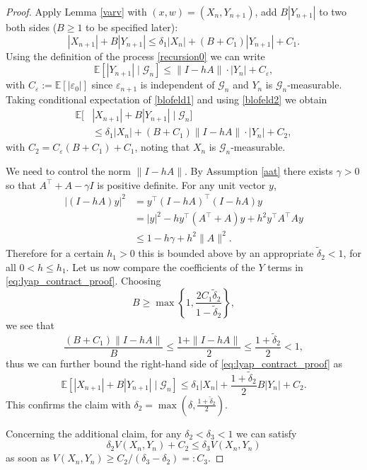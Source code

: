\documentclass{article}
\def\mE{\mathbb{E}}
\begin{document}
\begin{proof}
  Apply Lemma \ref{varv} with $(x,w)=(X_n,Y_{n+1})$, add $B|Y_{n+1}|$ to two both sides ($B\geq 1$ to be specified later):
\begin{equation}\label{blofeld1}
|X_{n+1}|+B|Y_{n+1}|\leq \delta_1 |X_{n}|+(B+C_1)|Y_{n+1}|+C_1.
\end{equation}
Using the definition of the process \eqref{recursion0} we can write
\begin{equation}\label{blofeld2}
\mE[|Y_{n+1}| \mid \mathcal{G}_{n}] \leq \|I-hA\|\cdot |Y_n| + C_{\varepsilon},
\end{equation}
with $C_{\varepsilon}:=\mE[|\varepsilon_0|]$ since $\varepsilon_{n+1}$ is independent of $\mathcal{G}_{n}$ and $Y_{n}$
is $\mathcal{G}_{n}$-measurable.
%
Taking conditional expectation of \eqref{blofeld1} and using \eqref{blofeld2} we obtain
\begin{equation}
  \label{eq:lyap_contract_proof}
  \begin{aligned}
    \mE[&|X_{n+1}|+B|Y_{n+1}|\mid\mathcal{G}_{n}]\\
    &\leq \delta_1 |X_{n}|+(B+C_1)\|I-hA\|\cdot |Y_n|+C_2,
  \end{aligned}    
\end{equation}
with $C_2 = C_{\varepsilon}(B+C_1)+C_1$, noting that $X_{n}$ is $\mathcal{G}_{n}$-measurable.

We need to control the norm $\|I-hA\|$.
By Assumption \ref{aat} there exists $\gamma>0$ so that $A^\top+A-\gamma I$ is positive definite. For any unit vector $y$,
\begin{align*}
|(I-hA)y|^2&= y^\top(I-hA)^\top(I-hA)y\\
&=|y|^2-hy^\top(A^\top+A)y+h^2y^\top A^\top A y\\
&\leq 1 - h\gamma +h^2\|A\|^2.  
\end{align*}
Therefore for a certain $h_1>0$ this is bounded above by an appropriate $\tilde\delta_2<1$,
for all $0<h\leq h_1$.
Let us now compare the coefficients of the $Y$ terms in \eqref{eq:lyap_contract_proof}.
Choosing $$B\geq \max\left\{1,\frac{2C_{1}\tilde{\delta}_{2}}{1-\tilde{\delta}_{2}}\right\},$$
we see that 
\[
\frac{(B+C_1)\|I-hA\|}{B}\leq \frac{1+\|I-hA\|}{2}\leq\frac{1+\tilde\delta_2}{2}<1,
\]
thus we can further bound the right-hand side of \eqref{eq:lyap_contract_proof} as
\begin{equation*}
    \mE[|X_{n+1}|+B|Y_{n+1}|\mid\mathcal{G}_{n}]\leq \delta_1 |X_{n}|+\frac{1+\tilde\delta_2}{2}B |Y_n|+C_2.
\end{equation*}
This confirms the claim with $\delta_2 = \max(\delta,\frac{1+\tilde\delta_2}{2})$.

Concerning the additional claim, for any $\delta_2<\delta_3<1$ we can satisfy 
$$\delta_2 V(X_{n},Y_{n})+C_2\leq \delta_3 
V(X_{n},Y_{n})$$ 
as soon as $V(X_{n},Y_{n})\geq C_2/(\delta_3-\delta_2)=:C_{3}$.
\end{proof}
\end{document}

